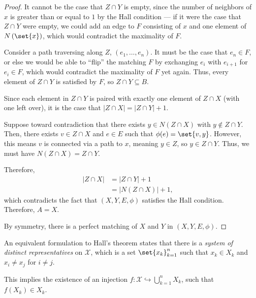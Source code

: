 \begin{proof}
  It cannot be the case that $Z\cap Y$ is empty, since the number of neighbors of $x$ is greater than or equal to $1$ by the Hall condition --- if it were the case that $Z\cap Y$ were empty, we could add an edge to $F$ consisting of $x$ and one element of $N\left(\set{x}\right)$, which would contradict the maximality of $F$.\newline

  Consider a path traversing along $Z$, $\left(e_1,\dots,e_n\right)$. It must be the case that $e_n\in F$, or else we would be able to ``flip'' the matching $F$ by exchanging $e_{i}$ with $e_{i+1}$ for $e_i\in F$, which would contradict the maximality of $F$ yet again. Thus, every element of $Z\cap Y$ is satisfied by $F$, so $Z\cap Y\subseteq B$.\newline

  Since each element in $Z\cap Y$ is paired with exactly one element of $Z\cap X$ (with one left over), it is the case that $\left\vert Z\cap X \right\vert = \left\vert Z\cap Y \right\vert + 1$.\newline

  Suppose toward contradiction that there exists $y\in N\left(Z\cap X\right)$ with $y\notin Z\cap Y$. Then, there exists $v\in Z\cap X$ and $e\in E$ such that $\phi(e) = \set{v,y}$. However, this means $v$ is connected via a path to $x$, meaning $y\in Z$, so $y\in Z\cap Y$. Thus, we must have $N\left(Z\cap X\right) = Z\cap Y$.\newline

  Therefore,
  \begin{align*}
    \left\vert Z\cap X \right\vert &= \left\vert Z\cap Y \right\vert + 1\\
                                   &= \left\vert N\left(Z\cap X\right) \right\vert + 1,
  \end{align*}
  which contradicts the fact that $\left(X,Y,E,\phi\right)$ satisfies the Hall condition. Therefore, $A = X$.\newline

  By symmetry, there is a perfect matching of $X$ and $Y$ in $\left(X,Y,E,\phi\right)$.
\end{proof}
\begin{remark}
  An equivalent formulation to Hall's theorem states that there is a \textit{system of distinct representatives} on $\mathcal{X}$, which is a set $\set{x_{k}}_{k=1}^{n}$ such that $x_{k}\in X_{k}$ and $x_{i}\neq x_j$ for $i\neq j$.\newline

  This implies the existence of an injection $f\colon \mathcal{X}\hookrightarrow \bigcup_{k=1}^{n}X_{k}$, such that $f\left(X_k\right) \in X_k$.
\end{remark}
